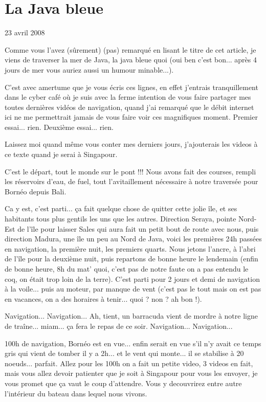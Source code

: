 \section{La Java bleue}

23 avril 2008

\begin{multicols}{2}

Comme vous l'avez (sûrement) (pas) remarqué en lisant le titre de cet article, je viens de traverser la mer de Java, la java bleue quoi (oui ben c'est bon... après 4 jours de mer vous auriez aussi un humour minable...).

C'est avec amertume que je vous écris ces lignes, en effet j'entrais tranquillement dans le cyber café où je suis avec la ferme intention de vous faire partager mes toutes dernières vidéos de navigation, quand j'ai remarqué que le débit internet ici ne me permettrait jamais de vous faire voir ces magnifiques moment. Premier essai... rien. Deuxième essai... rien.

Laissez moi quand même vous conter mes derniers jours, j'ajouterais les videos à ce texte quand je serai à Singapour.

C'est le départ, tout le monde sur le pont !!! Nous avons fait des courses, rempli les réservoirs d'eau, de fuel, tout l'avitaillement nécessaire à notre traversée pour Bornéo depuis Bali.

Ca y est, c'est parti... ça fait quelque chose de quitter cette jolie île, et ses habitants tous plus gentils les uns que les autres. Direction Seraya, pointe Nord-Est de l'île pour laisser Sales qui aura fait un petit bout de route avec nous, puis direction Madura, une île un peu au Nord de Java, voici les premières 24h passées en navigation, la première nuit, les premiers quarts. Nous jetons l'ancre, à l'abri de l'île pour la deuxième nuit, puis repartons de bonne heure le lendemain (enfin de bonne heure, 8h du mat' quoi, c'est pas de notre faute on a pas entendu le coq, on était trop loin de la terre). C'est parti pour 2 jours et demi de navigation à la voile... puis au moteur, par manque de vent (c'est pas le tout mais on est pas en vacances, on a des horaires à tenir... quoi ? non ? ah bon !).

Navigation... Navigation... Ah, tient, un barracuda vient de mordre à notre ligne de traîne... miam... ça fera le repas de ce soir. Navigation... Navigation...

100h de navigation, Bornéo est en vue... enfin serait en vue s'il n'y avait ce temps gris qui vient de tomber il y a 2h... et le vent qui monte... il se stabilise à 20 noeuds... parfait. Allez pour les 100h on a fait un petite video, 3 videos en fait, mais vous allez devoir patienter que je soit à Singapour pour vous les envoyer, je vous promet que ça vaut le coup d'attendre. Vous y decouvrirez entre autre l'intérieur du bateau dans lequel nous vivons.


\end{multicols}

